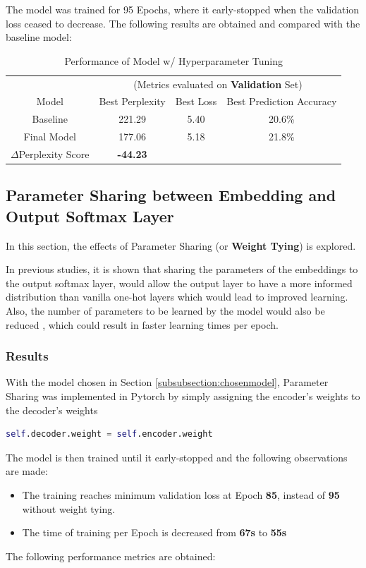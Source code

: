 \documentclass[sigconf,nonacm=true]{acmart}
\begin{document}
The model was trained for 95 Epochs, where it early-stopped when the validation loss ceased to decrease. The following results are obtained and compared with the baseline model:

\begin{table}[H]
	\label{tab:regbasecomp}
	\begin{adjustbox}{width=\columnwidth}
		\begin{tabular}{cccc}
			\toprule
			&\multicolumn{3}{c}{(Metrics evaluated on \textbf{Validation} Set)}\\
			Model &Best Perplexity&Best Loss&Best Prediction Accuracy\\
			\midrule
			Baseline & 221.29 & 5.40 & 20.6\% \\
			Final Model & 177.06 & 5.18 & 21.8\% \\
			\midrule
			$\Delta$Perplexity Score & \textbf{-44.23}\\
			\bottomrule
		\end{tabular}
	\end{adjustbox}
	\caption{Performance of Model w/ Hyperparameter Tuning}
\end{table}

\subsection{Parameter Sharing between Embedding and Output Softmax Layer}
In this section, the effects of Parameter Sharing (or \textbf{Weight Tying}) is explored. 

In previous studies, it is shown that sharing the parameters of the embeddings to the output softmax layer, would allow the output layer to have a more informed distribution than vanilla one-hot layers which would lead to improved learning. Also, the number of parameters to be learned by the model would also be reduced \cite{inan2016tying}, which could result in faster learning times per epoch.

\subsubsection{Results}
\label{subsubsection:weighttieresults}
With the model chosen in Section \ref{subsubsection:chosenmodel}, Parameter Sharing was implemented in Pytorch by simply assigning the encoder's weights to the decoder's weights
\begin{lstlisting}[language=Python]
self.decoder.weight = self.encoder.weight
\end{lstlisting}
The model is then trained until it early-stopped and the following observations are made:
\begin{itemize}
	\item The training reaches minimum validation loss at Epoch \textbf{85}, instead of \textbf{95} without weight tying.
	\item The time of training per Epoch is decreased from \textbf{67s} to \textbf{55s}
\end{itemize}
The following performance metrics are obtained:
\end{document}
